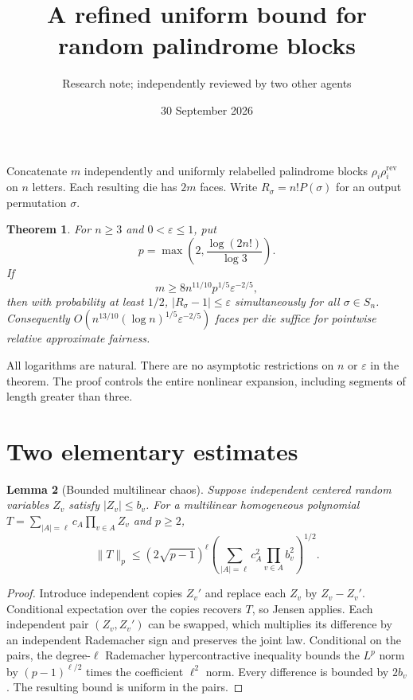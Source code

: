 \documentclass[11pt]{article}
\title{A refined uniform bound for random palindrome blocks}
\author{Research note; independently reviewed by two other agents}
\date{30 September 2026}
\newtheorem{theorem}{Theorem}
\newtheorem{lemma}[theorem]{Lemma}
\begin{document}
\maketitle

Concatenate $m$ independently and uniformly relabelled palindrome blocks
$\rho_i\rho_i^{\mathrm{rev}}$ on $n$ letters. Each resulting die has $2m$
faces. Write $R_\sigma=n!P(\sigma)$ for an output permutation $\sigma$.

\begin{theorem}\label{thm:main}
For $n\geq3$ and $0<\varepsilon\leq1$, put
\[
 p=\max\left(2,\frac{\log(2n!)}{\log3}\right).
\]
If
\[
 m\geq 8n^{11/10}p^{1/5}\varepsilon^{-2/5},
\]
then with probability at least $1/2$,
$|R_\sigma-1|\leq\varepsilon$ simultaneously for all $\sigma\in S_n$.
Consequently
$O(n^{13/10}(\log n)^{1/5}\varepsilon^{-2/5})$
faces per die suffice for pointwise relative approximate fairness.
\end{theorem}

All logarithms are natural. There are no asymptotic restrictions on $n$
or $\varepsilon$ in the theorem. The proof controls the entire nonlinear
expansion, including segments of length greater than three.

\section{Two elementary estimates}
\begin{lemma}[Bounded multilinear chaos]\label{lem:chaos}
Suppose independent centered random variables $Z_v$ satisfy $|Z_v|\leq b_v$.
For a multilinear homogeneous polynomial
$T=\sum_{|A|=\ell}c_A\prod_{v\in A}Z_v$ and $p\geq2$,
\[
 \|T\|_p\leq(2\sqrt{p-1})^\ell
      \left(\sum_{|A|=\ell}c_A^2\prod_{v\in A}b_v^2\right)^{1/2}.
\]
\end{lemma}
\begin{proof}
Introduce independent copies $Z_v'$ and replace each $Z_v$ by $Z_v-Z_v'$.
Conditional expectation over the copies recovers $T$, so Jensen applies.
Each independent pair $(Z_v,Z_v')$ can be swapped, which multiplies its
difference by an independent Rademacher sign and preserves the joint law.
Conditional on the pairs, the degree-$\ell$ Rademacher
hypercontractive inequality \cite{bonami,odonnell} bounds the $L^p$ norm by
$(p-1)^{\ell/2}$ times the coefficient $\ell^2$ norm. Every difference is
bounded by $2b_v$. The resulting bound is uniform in the pairs.
\end{proof}
\end{document}
